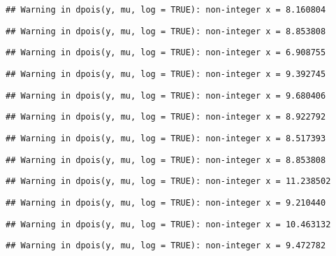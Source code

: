 \documentclass[
]{article}
\begin{document}
\begin{verbatim}
## Warning in dpois(y, mu, log = TRUE): non-integer x = 8.160804
\end{verbatim}

\begin{verbatim}
## Warning in dpois(y, mu, log = TRUE): non-integer x = 8.853808
\end{verbatim}

\begin{verbatim}
## Warning in dpois(y, mu, log = TRUE): non-integer x = 6.908755
\end{verbatim}

\begin{verbatim}
## Warning in dpois(y, mu, log = TRUE): non-integer x = 9.392745
\end{verbatim}

\begin{verbatim}
## Warning in dpois(y, mu, log = TRUE): non-integer x = 9.680406
\end{verbatim}

\begin{verbatim}
## Warning in dpois(y, mu, log = TRUE): non-integer x = 8.922792
\end{verbatim}

\begin{verbatim}
## Warning in dpois(y, mu, log = TRUE): non-integer x = 8.517393
\end{verbatim}

\begin{verbatim}
## Warning in dpois(y, mu, log = TRUE): non-integer x = 8.853808
\end{verbatim}

\begin{verbatim}
## Warning in dpois(y, mu, log = TRUE): non-integer x = 11.238502
\end{verbatim}

\begin{verbatim}
## Warning in dpois(y, mu, log = TRUE): non-integer x = 9.210440
\end{verbatim}

\begin{verbatim}
## Warning in dpois(y, mu, log = TRUE): non-integer x = 10.463132
\end{verbatim}

\begin{verbatim}
## Warning in dpois(y, mu, log = TRUE): non-integer x = 9.472782
\end{verbatim}
\end{document}
